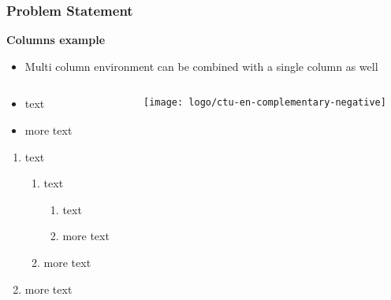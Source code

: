 \begin{frame}
   \frametitle{Problem Statement}
   \textbf{\color{ctu4blue}Columns example}
   \begin{itemize}\justifying
      \item Multi column environment can be combined with a single column as well  
   \end{itemize}
   \begin{columns}[t, onlytextwidth]
      \begin{column}[T]{0.70\textwidth}
	 \begin{itemize}\justifying
	    \item text
	    \item more text
	 \end{itemize}
    \begin{enumerate}\justifying
      \item text
      \begin{enumerate}\justifying
         \item text
         \begin{enumerate}\justifying
            \item text
            \item more text
         \end{enumerate}
         \item more text
      \end{enumerate}
      \item more text
   \end{enumerate}
      \end{column}
      \begin{column}[T]{0.28\textwidth}
	 \texttt{[image: logo/ctu-en-complementary-negative]}
      \end{column}
   \end{columns}

\end{frame}
